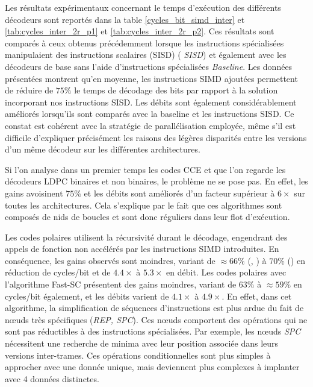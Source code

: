 \documentclass[../main.tex]{subfiles}
\begin{document}
Les résultats expérimentaux concernant le temps d'exécution des différents décodeurs sont reportés dans la table \ref{cycles_bit_simd_inter} et \ref{tab:cycles_inter_2r_p1} et \ref{tab:cycles_inter_2r_p2}.
Ces résultats sont comparés à ceux obtenus précédemment lorsque les instructions spécialisées manipulaient des instructions scalaires (SISD) (\textit{ SISD}) et également avec les décodeurs de base sans l'aide d'instructions spécialisées \textit{ Baseline}.
Les données présentées montrent qu'en moyenne, les instructions SIMD ajoutées permettent de réduire de $75\%$ le temps de décodage des bits par rapport à la solution incorporant nos instructions SISD. 
Les débits sont également considérablement améliorés lorsqu'ils sont comparés avec la baseline et les instructions SISD.
Ce constat est cohérent avec la stratégie de parallélisation employée, même s'il est difficile d'expliquer précisément les raisons des légères disparités entre les versions d'un même décodeur sur les différentes architectures.

Si l'on analyse dans un premier temps les codes CCE et que l'on regarde les décodeurs LDPC binaires et non binaires, le problème ne se pose pas.
En effet, les gains avoisinent $75\%$ et les débits sont améliorés d'un facteur supérieur à $6\times$ sur toutes les architectures. 
Cela s'explique par le fait que ces algorithmes sont composés de nids de boucles et sont donc réguliers dans leur flot d'exécution.

Les codes polaires utilisent la récursivité durant le décodage, engendrant des appels de fonction non accélérés par les instructions SIMD introduites. 
En conséquence, les gains observés sont moindres, variant de $\approx 66\%$ (\IBEX , \RISCY ) à $70\%$ (\SCR) en réduction de cycles/bit et de $4.4\times$ à $5.3\times$ en débit. 
Les codes polaires avec l'algorithme Fast-SC présentent des gains moindres, variant de $63\%$ à $\approx 59\%$ en cycles/bit également, et les débits varient de $4.1\times$ à $4.9\times$. 
En effet, dans cet algorithme, la simplification de séquences d'instructions est plus ardue du fait de nœuds très spécifiques (\textit{REP, SPC}). 
Ces nœuds comportent des opérations qui ne sont pas réductibles à des instructions spécialisées.
Par exemple, les nœuds \textit{SPC} nécessitent une recherche de minima avec leur position associée dans leurs versions inter-trames. 
Ces opérations conditionnelles sont plus simples à approcher avec une donnée unique, mais deviennent plus complexes à implanter avec 4 données distinctes.  
\end{document}

